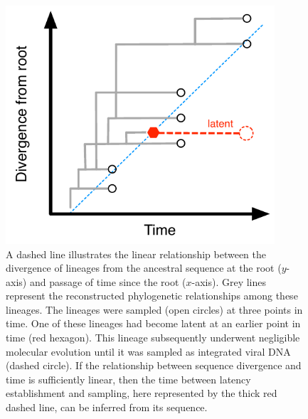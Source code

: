 \documentclass{bmcart}
\begin{document}
\begin{backmatter}
\begin{figure}[h!]
	\centering
	\includegraphics[width=10cm]{latency-scheme}
	\caption{%
	A dashed line illustrates the linear relationship between the divergence of lineages from the ancestral sequence at the root ($y$-axis) and passage of time since the root ($x$-axis).
	Grey lines represent the reconstructed phylogenetic relationships among these lineages.
	The lineages were sampled (open circles) at three points in time.
	One of these lineages had become latent at an earlier point in time (red hexagon).
	This lineage subsequently underwent negligible molecular evolution until it was sampled as integrated viral DNA (dashed circle).
	If the relationship between sequence divergence and time is sufficiently linear, then the time between latency establishment and sampling, here represented by the thick red dashed line, can be inferred from its sequence.
	}
	\label{fig:latenttree}
\end{figure}



\end{backmatter}
\end{document}
